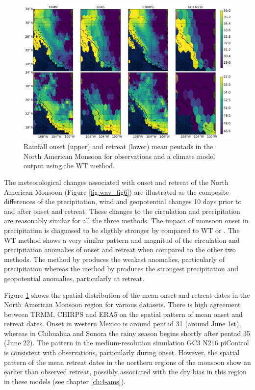 \begin{figure}[t!]
\centering
 \includegraphics[width=\linewidth]{figures/map_nam_wav.pdf}
\caption[Onset and retreat spatial distribution in North American Monsoon]{ Rainfall onset (upper) and retreat (lower) mean pentads in the North American Monsoon for observations and a climate model output using the WT method.  }
\label{fig:nam_map}
\end{figure}

The meteorological changes associated with onset and retreat of the North American Monsoon  (Figure \ref{fig:wav_fig6}) are illustrated as the composite differences of the precipitation, wind and geopotential changes 10 days prior to and after onset and retreat. These changes to the circulation and precipitation are reasonably similar for all the three methods. The impact of monsoon onset in precipitation is diagnosed to be sligthly stronger by  compared to WT or . 
The WT method shows a very similar pattern and magnitud of the circulation and precipitation anomalies of onset and retreat when compared to the other two methods. The method by  produces the weakest anomalies, particularly of precipitation whereas the method by  produces the strongest precipitation and geopotential anomalies, particularly at retreat.

Figure \ref{fig:nam_map} shows the spatial distribution of the mean onset and retreat dates in the North American Monsoon region for various datasets.
There is high agreement between TRMM, CHIRPS and ERA5 on the spatial pattern of mean onset and retreat dates.
Onset in western Mexico is around pentad 31 (around June 1st), whereas in Chihuahua and Sonora the rainy season begins shortly after pentad 35 (June 22).
The pattern in the medium-resolution simulation GC3 N216 piControl is consistent with observations, particularly during onset.  However, the spatial pattern of the mean retreat dates in the northern regions of the monsoon show an earlier than observed retreat, possibly associated with the dry bias in this region in these models (see chapter \ref{ch:4-ams}).

